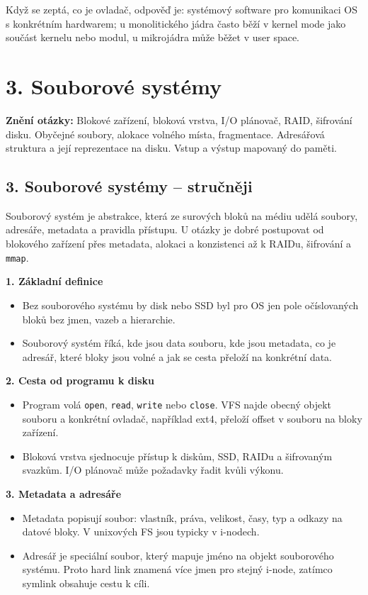 \documentclass[11pt,a4paper]{article}
\newcommand{\otazka}[3]{\section*{#1}\addcontentsline{toc}{section}{#1}\noindent\textbf{Znění otázky:} #2\par\medskip}
\begin{document}
Když se zeptá, co je ovladač, odpověď je: systémový software pro komunikaci OS s konkrétním hardwarem; u monolitického jádra často běží v kernel mode jako součást kernelu nebo modul, u mikrojádra může běžet v user space.

\newpage

\otazka{3. Souborové systémy}{Blokové zařízení, bloková vrstva, I/O plánovač, RAID, šifrování disku. Obyčejné soubory, alokace volného místa, fragmentace. Adresářová struktura a její reprezentace na disku. Vstup a výstup mapovaný do paměti.}{PB152, PV004}

\subsection*{3. Souborové systémy -- stručněji}
Souborový systém je abstrakce, která ze surových bloků na médiu udělá soubory, adresáře, metadata a pravidla přístupu. U otázky je dobré postupovat od blokového zařízení přes metadata, alokaci a konzistenci až k RAIDu, šifrování a \texttt{mmap}.

\textbf{1. Základní definice}
\begin{itemize}
  \item Bez souborového systému by disk nebo SSD byl pro OS jen pole očíslovaných bloků bez jmen, vazeb a hierarchie.
  \item Souborový systém říká, kde jsou data souboru, kde jsou metadata, co je adresář, které bloky jsou volné a jak se cesta přeloží na konkrétní data.
\end{itemize}

\textbf{2. Cesta od programu k disku}
\begin{itemize}
  \item Program volá \texttt{open}, \texttt{read}, \texttt{write} nebo \texttt{close}. VFS najde obecný objekt souboru a konkrétní ovladač, například ext4, přeloží offset v souboru na bloky zařízení.
  \item Bloková vrstva sjednocuje přístup k diskům, SSD, RAIDu a šifrovaným svazkům. I/O plánovač může požadavky řadit kvůli výkonu.
\end{itemize}

\textbf{3. Metadata a adresáře}
\begin{itemize}
  \item Metadata popisují soubor: vlastník, práva, velikost, časy, typ a odkazy na datové bloky. V unixových FS jsou typicky v i-nodech.
  \item Adresář je speciální soubor, který mapuje jméno na objekt souborového systému. Proto hard link znamená více jmen pro stejný i-node, zatímco symlink obsahuje cestu k cíli.
\end{itemize}
\end{document}
